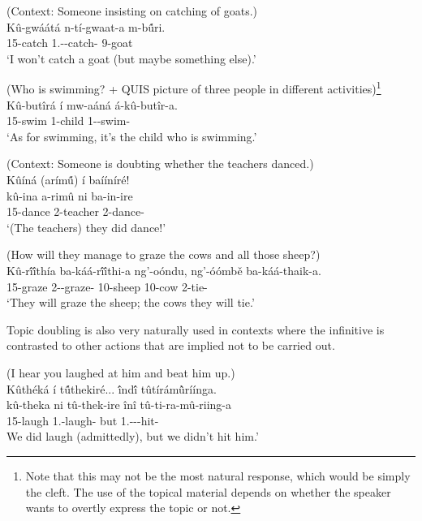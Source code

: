 \documentclass[output=paper]{langscibook}
\begin{document}
\ea
\label{bkm:Ref131610727}
(Context: Someone insisting on catching of goats.)\\
\gll
Kû-gwáátá  n-tí-gwaat-a  m-b\'{û}ri.\\
15-catch 1\SG.\SM-\NEG{}-catch-\FV{} 9-goat\\
\glt
‘I won’t catch a goat (but maybe something else).’

\z
\ea
\label{bkm:Ref149295131}
(Who is swimming? + QUIS picture of three people in different activities)\footnote{Note that this may not be the most natural response, which would be simply the cleft. The use of the topical material depends on whether the speaker wants to overtly express the topic or not.}\\
\gll
Kû-butîrá  í  mw-aáná  á-kû-butîr-a. \\
15-swim \FOC{} 1-child 1\SM-\PRS{}-swim-\FV{}\\
\glt
‘As for swimming, it’s the child who is swimming.’

\z


\ea
\label{bkm:Ref115798439}
(Context: Someone is doubting whether the teachers danced.)\\
Kûíná (arím\'{û}) í baííníré!\\
\gll
kû-ina  a-rimû  ni  ba-in-ire\\
15-dance  2-teacher \FOC{}  2\SM{}-dance-\PFV{}\\
\glt
‘(The teachers) they did dance!’

\z

\ea
(How will they manage to graze the cows and all those sheep?)\\
\gll
Kû-r\'{î}\'{î}thía  ba-káá-r\'{î}\'{î}thi-a  ng’-oóndu,  ng’-óómbě  ba-káá-thaik-a.\\
15-graze 2\SM-\FUT{}-graze-\FV{} 10-sheep  10-cow 2\SM{}-tie-\FV{}\\
\glt
‘They will graze the sheep; the cows they will tie.’

\z


Topic doubling is also very naturally used in contexts where the infinitive is contrasted to other actions that are implied not to be carried out.

\ea
(I hear you laughed at him and beat him up.)\\
Kûthéká í t\'{û}thekiré... \'{î}nd\'{î} tûtírám\`{û}ríínga.\\
\gll
kû-theka  ni  tû-thek-ire  înî  tû-ti-ra-mû-riing-a\\
15-laugh \FOC{} 1\PL.\SM{}-laugh-\PFV{} but 1\PL.\SM-\NEG-\OM{}-hit-\FV{}\\
\glt
We did laugh (admittedly), but we didn’t hit him.’
\end{document}
